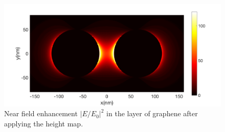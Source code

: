 \begin{figure}[!h]
  \centering
  \includegraphics[width=\textwidth]{./images/graphene-layer.png}
  \caption{Near field enhancement $|E/E_0|^2$ in the layer of graphene after applying the height map.}
\end{figure}

